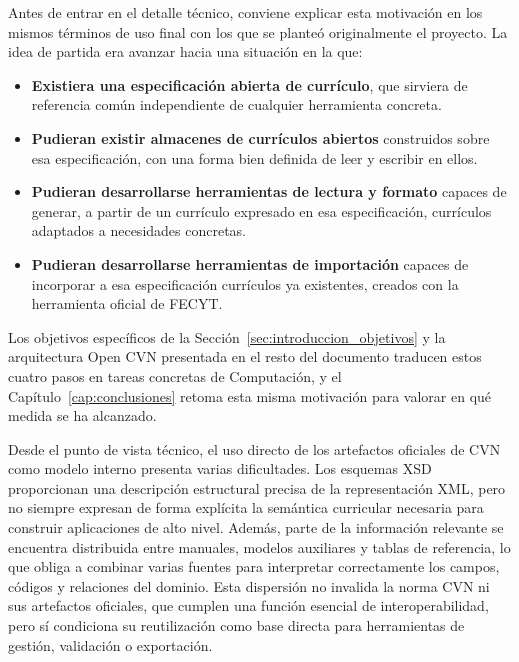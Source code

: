 Antes de entrar en el detalle técnico, conviene explicar esta motivación en
los mismos términos de uso final con los que se planteó originalmente el
proyecto. La idea de partida era avanzar hacia una situación en la que:

\begin{itemize}
  \item \textbf{Existiera una especificación abierta de currículo}, que
  sirviera de referencia común independiente de cualquier herramienta
  concreta.

  \item \textbf{Pudieran existir almacenes de currículos abiertos}
  construidos sobre esa especificación, con una forma bien definida de leer
  y escribir en ellos.

  \item \textbf{Pudieran desarrollarse herramientas de lectura y formato}
  capaces de generar, a partir de un currículo expresado en esa
  especificación, currículos adaptados a necesidades concretas.

  \item \textbf{Pudieran desarrollarse herramientas de importación}
  capaces de incorporar a esa especificación currículos ya existentes,
  creados con la herramienta oficial de FECYT.
\end{itemize}

Los objetivos específicos de la Sección~\ref{sec:introduccion_objetivos} y la
arquitectura Open CVN presentada en el resto del documento traducen estos
cuatro pasos en tareas concretas de Computación, y el
Capítulo~\ref{cap:conclusiones} retoma esta misma motivación para valorar en
qué medida se ha alcanzado.

Desde el punto de vista técnico, el uso directo de los artefactos oficiales de CVN
como modelo interno presenta varias dificultades. Los esquemas XSD proporcionan
una descripción estructural precisa de la representación XML, pero no siempre
expresan de forma explícita la semántica curricular necesaria para construir
aplicaciones de alto nivel. Además, parte de la información relevante se encuentra
distribuida entre manuales, modelos auxiliares y tablas de referencia, lo que
obliga a combinar varias fuentes para interpretar correctamente los campos,
códigos y relaciones del dominio. Esta dispersión no invalida la norma CVN ni sus
artefactos oficiales, que cumplen una función esencial de interoperabilidad, pero
sí condiciona su reutilización como base directa para herramientas de gestión,
validación o exportación.

